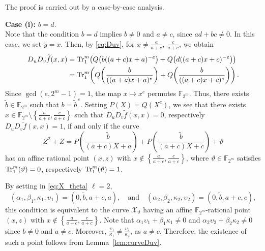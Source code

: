 \documentclass[12pt]{article}
\theoremstyle{plain}
\theoremstyle{definition}
\newcommand{\F}{\mathbb{F}}
\newcommand{\Tr}{{\rm Tr}}
\begin{document}
	\medskip
	
	The proof is carried out by a case-by-case analysis.
	
	\medskip
	
	\noindent \textbf{Case (i):} $b=d$.  \\[.3em]
	Note that the condition $b=d$ implies $b\neq 0$ and $a\neq c$, since
	$ad+bc\neq 0$.
	In this case, we set $y=x$.
	Then, by \eqref{eq:Duv}, for $x\neq \tfrac{a}{a+c},\ \tfrac{c}{a+c}$,
	we obtain
	\begin{align*}
		D_uD_v\widetilde{f}(x,x)
		&=
		\Tr^m_1\!\left(
		Q\bigl(b((a+c)x+a)^{-e}\bigr)
		+
		Q\bigl(d((a+c)x+c)^{-e}\bigr)
		\right) \\
		&=
		\Tr^m_1\!\left(
		Q\!\left( \frac{b}{((a+c)x+a)^{e}} \right)
		+
		Q\!\left( \frac{b}{((a+c)x+c)^{e}} \right)
		\right).
	\end{align*}
	Since $\gcd(e,2^m-1)=1$, the map $x\mapsto x^e$ permutes $\F_{2^m}$.
	Thus, there exists $\tilde b\in\F_{2^m}$ such that $b=\tilde b^{\,e}$.
	Setting $P(X)=Q(X^e)$, we see that there exists
	$x\in \F_{2^m}\setminus\left\{\frac{a}{a+c},\frac{c}{a+c}\right\}$
	such that
	$D_uD_v\tilde f(x,x)=0$, respectively $D_uD_v\tilde f(x,x)=1$,
	if and only if the curve
	\[
	Z^2+Z
	=
	P\!\left( \frac{\tilde b}{(a+c)X+a} \right)
	+
	P\!\left( \frac{\tilde b}{(a+c)X+c} \right)
	+\vartheta
	\]
	has an affine rational point $(x,z)$ with
	$x\notin \left\{\frac{a}{a+c},\frac{c}{a+c}\right\}$,
	where $\vartheta\in\F_{2^m}$ satisfies
	$\Tr^m_1(\vartheta)=0$, respectively $\Tr^m_1(\vartheta)=1$.
	
	By setting in \eqref{eq:X_theta} $\ell=2$,
	\[
	(\alpha_1,\beta_1,\kappa_1,\upsilon_1)=(0,\tilde b,a+c,a),
	\quad \text{and} \quad
	(\alpha_2,\beta_2,\kappa_2,\upsilon_2)=(0,\tilde b,a+c,c),
	\]
	this condition is equivalent to the curve $\mathcal{X}_\vartheta$
	having an affine $\F_{2^m}$-rational point $(x,z)$ with
	$x\notin \left\{\frac{a}{a+c},\frac{c}{a+c}\right\}$.
	Note that $\alpha_1\upsilon_1+\beta_1\kappa_1\neq 0$ and $\alpha_2\upsilon_2+\beta_2\kappa_2\neq 0$
	since $b\neq 0$ and $a\neq c$.
	Moreover, $\tfrac{\upsilon_1}{\kappa_1}\neq \tfrac{\upsilon_2}{\kappa_2}$,
	as $a\neq c$.
	Therefore, the existence of such a point follows from
	Lemma~\ref{lem:curveDuv}.
	
	\medskip
	
\end{document}
